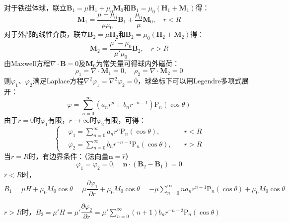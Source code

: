 \documentclass[a4paper,fontset=none]{ctexart}
\begin{document}
\begin{itemize}
    对于铁磁体球，联立$\bm{B}_1=\mu\bm{H}_1+\mu_0\bm{M}_0$和$\bm{B}_1=\mu_0(\bm{H}_1+\bm{M}_1)$得：
    \[
        \bm{M}_1 = \frac{\mu-\mu_0}{\mu\mu_0}\bm{B}_1 + \frac{\mu_0}{\mu}\bm{M}_0,\quad r<R
    \]
    对于外部的线性介质，联立$\bm{B}_2=\mu\bm{H}_2$和$\bm{B}_2=\mu_0(\bm{H}_2+\bm{M}_2)$得：
    \[
        \bm{M}_2 = \frac{\mu'-\mu_0}{\mu'\mu_0}\bm{B}_2,\quad r>R
    \]
    由Maxwell方程$\nabla\cdot\bm{B}=0$及$\bm{M}_0$为常矢量可得球内外磁荷：
    \[
        \rho_1=\nabla\cdot\bm{M}_1=0,\quad
        \rho_2=\nabla\cdot\bm{M}_2=0
    \]
    则$\varphi_1$、$\varphi_2$满足Laplace方程$\nabla^2\varphi_1=\nabla^2\varphi_2=0$，球坐标下可以用Legendre多项式展开：
    \[
    \varphi = \sum_{n=0}^\infty (a_n r^n + b_n r^{-n-1})\mathrm{P}_n(\cos\theta)
    \]
    由于$r=0$时$\varphi_1$有限，$r\to\infty$时$\varphi_2$有限，可得：
    \[
    \left\{
        \begin{aligned}
        &\varphi_1 = \sum_{n=0}^\infty a_n r^n\mathrm{P}_n(\cos\theta),\quad &r<R \\
        &\varphi_2 = \sum_{n=0}^\infty b_n r^{-n-1}\mathrm{P}_n(\cos\theta),\quad &r>R
        \end{aligned}
    \right.
    \]
    当$r=R$时，有边界条件：（法向量$\bm{n}=\hat{r}$）
    \[
    \varphi_1 = \varphi_2 = 0,\quad \bm{n}\cdot(\bm{B}_2-\bm{B}_1) = 0
    \]
    $r<R$时，$B_1=\mu H+\mu_0M_0\cos\theta=\mu\dfrac{\partial\varphi_1}{\partial r}+\mu_0M_0\cos\theta=-\mu\sum\limits_{n=0}^\infty n a_n r^{n-1}\mathrm{P}_n(\cos\theta)+\mu_0M_0\cos\theta$

    $r>R$时，$B_2=\mu'H=\mu'\dfrac{\partial\varphi_2}{\partial r}=\mu'\sum\limits_{n=0}^\infty (n+1)b_n r^{-n-2}\mathrm{P}_n(\cos\theta)$


\end{itemize}
\end{document}
